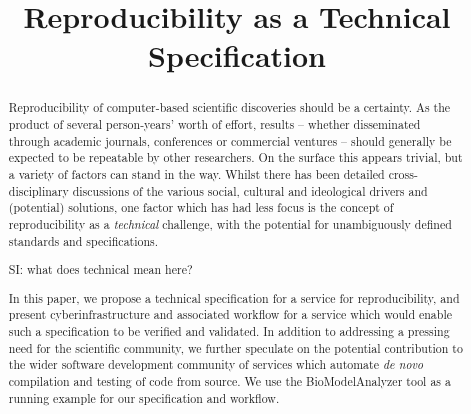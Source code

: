 \documentclass[conference]{IEEEtran}
\begin{document}
%
\title{Reproducibility as a Technical Specification}


\author{
\and
{}
\and
{}
}





\maketitle


\begin{abstract}
Reproducibility of computer-based scientific discoveries should be a
certainty. As the product of several person-years' worth of effort,
results -- whether disseminated through academic journals, conferences
or commercial ventures -- should generally be expected to be
repeatable by other researchers. On the surface this appears trivial,
but a variety of factors can stand in the way. Whilst there has been
detailed cross-disciplinary discussions of the various social,
cultural and ideological drivers and (potential) solutions, one factor
which has had less focus is the concept of reproducibility as a
\emph{technical} challenge, with the potential for unambiguously
defined standards and specifications.

SI: what does technical mean here? 

In this paper, we propose a technical specification for a service for
reproducibility, and present cyberinfrastructure and
associated workflow for a service which would enable such a
specification to be verified and validated. In addition to addressing
a pressing need for the scientific community, we further speculate on
the potential contribution to the wider software development community
of services which automate \emph{de novo} compilation and testing of
code from source. We use the BioModelAnalyzer tool as a running example 
for our specification and workflow. 
\end{abstract}
\end{document}
